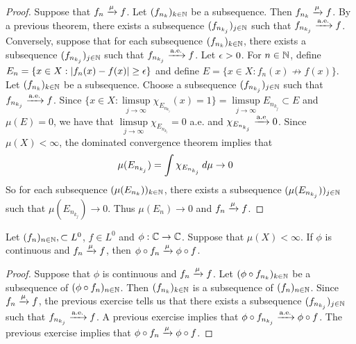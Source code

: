 \documentclass{book}
\begin{document}
	\begin{proof}
		Suppose that $f_n \xrightarrow{\mu} f$. Let $(f_{n_k})_{k \in \mathbb{N}}$ be a subsequence. Then $f_{n_k} \xrightarrow{\mu} f$. By a previous theorem, there exists a subsequence $(f_{n_{k_j}})_{j \in \mathbb{N}}$ such that $f_{n_{k_j}} \xrightarrow{\text{a.e.}} f$. Conversely, suppose that for each subsequence $(f_{n_k})_{k \in \mathbb{N}}$, there exists a subsequence $(f_{n_{k_j}})_{j \in \mathbb{N}}$ such that $f_{n_{k_j}} \xrightarrow{\text{a.e.}} f$. Let $\epsilon >0$. For $n \in \mathbb{N}$, define $E_{n} = \{x \in X: |f_n(x) - f(x) | \geq \epsilon\}$ and define $E = \{x \in X: f_n(x) \not \rightarrow f(x)\}$. Let $(f_{n_k})_{k \in \mathbb{N}}$ be a subsequence. Choose a subsequence $(f_{n_{k_j}})_{j \in \mathbb{N}}$ such that $f_{n_{k_j}} \xrightarrow{\text{a.e.}} f$. Since $\bigg \{x \in X: \limsup\limits_{j \rightarrow \infty} \chi_{E_{n_{k_j}}}(x) = 1\bigg \} = \limsup\limits_{j \rightarrow \infty} E_{n_{k_j}} \subset E$ and $\mu(E) = 0$, we have that $\limsup\limits_{j \rightarrow \infty} \chi_{E_{n_{k_j}}} = 0$ a.e. and $\chi_{E_{n_{k_j}}} \xrightarrow{\text{a.e}} 0$. Since $\mu(X) < \infty$, the dominated convergence theorem implies that 
		\begin{align*}
			\mu(E_{n_{k_j}}) 
			&= \int \chi_{E_{n_{k_j}}} \, d \mu  \rightarrow 0
		\end{align*} 
		So for each subsequence $(\mu(E_{n_k}))_{k \in \mathbb{N}}$, there exists a subsequence $(\mu(E_{n_{k_j}}))_{j \in \mathbb{N}}$ such that $\mu(E_{n_{k_j}}) \rightarrow 0$. Thus $\mu(E_n) \rightarrow 0$ and $f_n \xrightarrow{\mu} f$.
	\end{proof}
	
	\begin{ex}  
		Let $(f_n)_{n \in \mathbb{N}}, \subset L^0$, $f \in L^0$ and $\phi: \mathbb{C} \rightarrow \mathbb{C}$. Suppose that $\mu(X) < \infty$. If $\phi$ is continuous and $f_n \xrightarrow{\mu} f$, then $\phi \circ f_n \xrightarrow{\mu} \phi \circ f$.
	\end{ex}
	
	\begin{proof}
		Suppose that $\phi$ is continuous and $f_n \xrightarrow{\mu} f$. Let $(\phi \circ f_{n_k})_{k \in \mathbb{N}}$ be a subsequence of $(\phi \circ f_{n})_{n \in \mathbb{N}}$. Then $(f_{n_k})_{k \in \mathbb{N}}$ is a subsequence of $(f_{n})_{n \in \mathbb{N}}$. Since $f_n \xrightarrow{\mu} f$, the previous exercise tells us that there exists a subsequence $(f_{n_{k_j}})_{j \in \mathbb{N}}$ such that $f_{n_{k_j}} \xrightarrow{\text{a.e.}} f$. A previous exercise implies that $\phi \circ f_{n_{k_j}}\xrightarrow{\text{a.e.}} \phi \circ f$. The previous exercise implies that $\phi \circ f_{n}\xrightarrow{\mu} \phi \circ f$.
	\end{proof}
	
\end{document}
